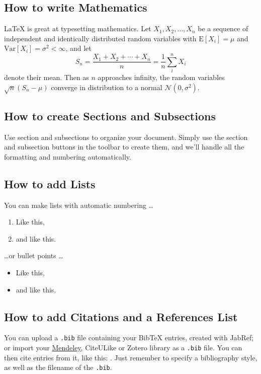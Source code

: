 \documentclass[a4paper]{article}
\begin{document}
\subsection{How to write Mathematics}

\LaTeX{} is great at typesetting mathematics. Let $X_1, X_2, \ldots, X_n$ be a sequence of independent and identically distributed random variables with $\text{E}[X_i] = \mu$ and $\text{Var}[X_i] = \sigma^2 < \infty$, and let
\[S_n = \frac{X_1 + X_2 + \cdots + X_n}{n}
      = \frac{1}{n}\sum_{i}^{n} X_i\]
denote their mean. Then as $n$ approaches infinity, the random variables $\sqrt{n}(S_n - \mu)$ converge in distribution to a normal $\mathcal{N}(0, \sigma^2)$.


\subsection{How to create Sections and Subsections}

Use section and subsections to organize your document. Simply use the section and subsection buttons in the toolbar to create them, and we'll handle all the formatting and numbering automatically.

\subsection{How to add Lists}

You can make lists with automatic numbering \dots

\begin{enumerate}
\item Like this,
\item and like this.
\end{enumerate}
\dots or bullet points \dots
\begin{itemize}
\item Like this,
\item and like this.
\end{itemize}

\subsection{How to add Citations and a References List}

You can upload a \verb|.bib| file containing your BibTeX entries, created with JabRef; or import your \href{https://www.overleaf.com/blog/184}{Mendeley}, CiteULike or Zotero library as a \verb|.bib| file. You can then cite entries from it, like this: \cite{greenwade93}. Just remember to specify a bibliography style, as well as the filename of the \verb|.bib|.
\end{document}
